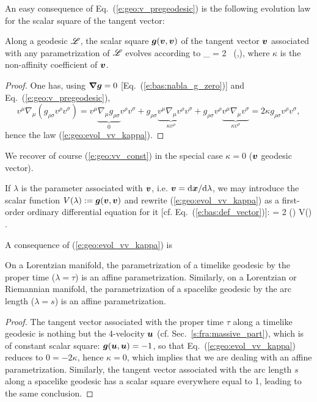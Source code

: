 An easy consequence of Eq.~(\ref{e:geo:v_pregeodesic}) is the following
evolution law for the scalar square of the tangent vector:
\begin{greybox}
Along a geodesic $\mathscr{L}$, the scalar square $\bm{g}(\bm{v},\bm{v})$
of the tangent vector $\bm{v}$ associated with any parametrization of $\mathscr{L}$
evolves according to
\be \label{e:geo:evol_vv_kappa}
    \wnab_{\!} \left[ \w{g}(\w{v},\w{v}) \right] = 2 \kappa \, (,),
\ee
where $\kappa$ is the non-affinity coefficient of $\bm{v}$.
\end{greybox}
\begin{proof}
One has, using $\bm{\nabla}\bm{g}=0$ [Eq.~(\ref{e:bas:nabla_g_zero})] and Eq.~(\ref{e:geo:v_pregeodesic}),
\[
    v^\mu \nabla_\mu (g_{\rho\sigma} v^\rho v^\sigma)  = v^\mu \underbrace{\nabla_\mu g_{\rho\sigma}}_{0} v^\rho v^\sigma
                + g_{\rho\sigma} \underbrace{v^\mu \nabla_\mu v^\rho}_{\kappa v^\rho} v^\sigma
                + g_{\rho\sigma} v^\rho \underbrace{v^\mu \nabla_\mu v^\sigma}_{\kappa v^\sigma}
             = 2 \kappa  g_{\rho\sigma} v^\rho v^\sigma  ,
\]
hence the law (\ref{e:geo:evol_vv_kappa}).
\end{proof}
We recover of course (\ref{e:geo:vv_const}) in the special case $\kappa = 0$
($\bm{v}$ geodesic vector).
\begin{remark}
If $\lambda$ is the parameter associated with $\bm{v}$, i.e. $\bm{v} = \mathrm{d}\bm{x}/\mathrm{d}\lambda$,
we may introduce the scalar function $V(\lambda) := \bm{g}(\bm{v},\bm{v})$ and
rewrite (\ref{e:geo:evol_vv_kappa}) as a first-order ordinary differential equation
for it [cf. Eq.~(\ref{e:bas:def_vector})]:
\be
     = 2 \kappa(\lambda) V(\lambda) .
\ee
\end{remark}
A consequence of (\ref{e:geo:evol_vv_kappa}) is
\begin{greybox}
On a Lorentzian manifold, the parametrization of a timelike geodesic
by the proper time ($\lambda = \tau$) is an affine parametrization.
Similarly, on a Lorentzian or Riemannian manifold, the parametrization of a
spacelike geodesic
by the arc length ($\lambda = s$) is an affine parametrization.
\end{greybox}
\begin{proof}
The tangent vector associated with the proper time $\tau$ along a timelike geodesic
is nothing but the 4-velocity $\bm{u}$ (cf. Sec.~\ref{s:fra:massive_part}), which
is of constant scalar square: $\bm{g}(\bm{u},\bm{u}) = -1$, so that Eq.~(\ref{e:geo:evol_vv_kappa})
reduces to $0 = -2 \kappa$, hence $\kappa=0$, which implies that we are dealing
with an affine parametrization. Similarly, the tangent vector associated with the
arc length $s$ along a spacelike geodesic has a scalar square everywhere equal
to 1, leading to the same conclusion.
\end{proof}

